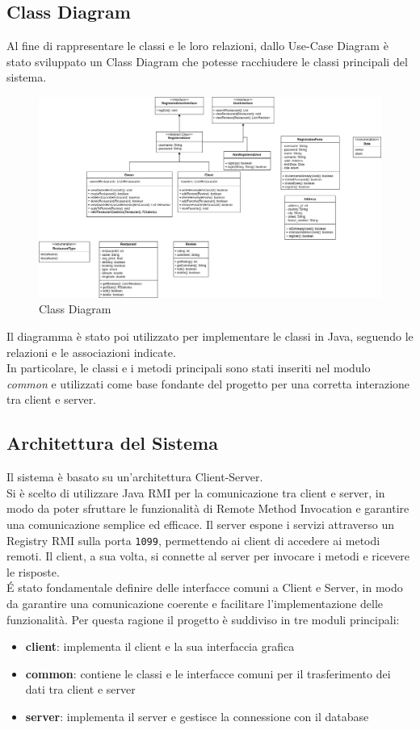 \subsection{Class Diagram}
Al fine di rappresentare le classi e le loro relazioni, dallo 
Use-Case Diagram è stato sviluppato un Class Diagram che potesse 
racchiudere le classi principali del sistema.
\begin{figure}[H]
  \centering
  \includegraphics[width=\textwidth]{images/UML-Class-Diagram.png}
  \caption{Class Diagram}
  \label{fig:class-diagram}
\end{figure}
Il diagramma è stato poi utilizzato per implementare le classi 
in Java, seguendo le relazioni e le associazioni
indicate.\\
In particolare, le classi e i metodi principali sono stati inseriti 
nel modulo \textit{common} e utilizzati come base fondante del progetto 
per una corretta interazione tra client e server.

\subsection{Architettura del Sistema}
Il sistema è basato su un'architettura Client-Server.\\
Si è scelto di utilizzare Java RMI per la comunicazione tra client e server,
in modo da poter sfruttare le funzionalità di Remote Method Invocation 
e garantire una comunicazione semplice ed efficace.
Il server espone i servizi attraverso un Registry RMI sulla porta 
\texttt{1099}, permettendo ai client di accedere ai metodi remoti.
Il client, a sua volta, si connette al server per invocare i metodi
e ricevere le risposte.\\

\'E stato fondamentale definire delle interfacce comuni a Client 
e Server, in modo da garantire una comunicazione coerente e
facilitare l'implementazione delle funzionalità.
Per questa ragione il progetto è suddiviso in tre moduli principali:
\begin{itemize}
  \item \textbf{client}: implementa il client e la sua interfaccia grafica
  \item \textbf{common}: contiene le classi e le interfacce comuni per il trasferimento dei dati tra client e server
  \item \textbf{server}: implementa il server e gestisce la connessione con il database
\end{itemize}

